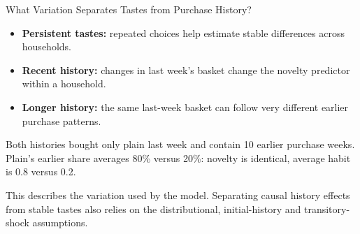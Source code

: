 \documentclass[aspectratio=169,professionalfonts]{beamer}
\newcommand{\shortbuttons}{}
\begin{document}
\gdef\shortbuttons{}
\begin{frame}[label=short-identification]{What Variation Separates Tastes from Purchase History?}
  \begin{itemize}
    \item \textbf{Persistent tastes:} repeated choices help estimate stable
    differences across households.
    \item \textbf{Recent history:} changes in last week's basket change the
    novelty predictor within a household.
    \item \textbf{Longer history:} the same last-week basket can follow very
    different earlier purchase patterns.
  \end{itemize}
  \begin{tcolorbox}
    Both histories bought only plain last week and contain 10 earlier purchase weeks.
    Plain's earlier share averages 80\% versus 20\%: novelty is identical,
    average habit is 0.8 versus 0.2.
  \end{tcolorbox}
  \par\smallskip\footnotesize This describes the variation used by the model.
  Separating causal history effects from stable tastes also relies on the
  distributional, initial-history and transitory-shock assumptions.
\end{frame}
\end{document}
